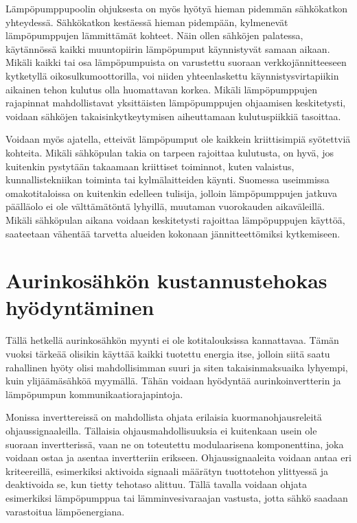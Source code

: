   Lämpöpumppupoolin ohjuksesta on myös hyötyä hieman pidemmän sähkökatkon yhteydessä. Sähkökatkon kestäessä hieman pidempään, kylmenevät lämpöpumppujen lämmittämät kohteet. Näin ollen sähköjen palatessa, käytännössä kaikki muuntopiirin lämpöpumput käynnistyvät samaan aikaan. Mikäli kaikki tai osa lämpöpumpuista on varustettu suoraan verkkojännitteeseen kytketyllä oikosulkumoottorilla, voi niiden yhteenlaskettu käynnistysvirtapiikin aikainen tehon kulutus olla huomattavan korkea. Mikäli lämpöpumppujen rajapinnat mahdollistavat yksittäisten lämpöpumppujen ohjaamisen keskitetysti, voidaan sähköjen takaisinkytkeytymisen aiheuttamaan kulutuspiikkiä tasoittaa.

  Voidaan myös ajatella, etteivät lämpöpumput ole kaikkein kriittisimpiä syötettviä kohteita. Mikäli sähköpulan takia on tarpeen rajoittaa kulutusta, on hyvä, jos kuitenkin pystytään takaamaan kriittiset toiminnot, kuten valaistus, kunnallistekniikan toiminta tai kylmälaitteiden käynti. Suomessa useimmissa omakotitaloissa on kuitenkin edelleen tulisija, jolloin lämpöpumppujen jatkuva päälläolo ei ole välttämätöntä lyhyillä, muutaman vuorokauden aikaväleillä. Mikäli sähköpulan aikana voidaan keskitetysti rajoittaa lämpöpuppujen käyttöä, saateetaan vähentää tarvetta alueiden kokonaan jännitteettömiksi kytkemiseen.

\section{Aurinkosähkön kustannustehokas hyödyntäminen}

  Tällä hetkellä aurinkosähkön myynti ei ole kotitalouksissa kannattavaa. Tämän vuoksi tärkeää olisikin käyttää kaikki tuotettu energia itse, jolloin siitä saatu rahallinen hyöty olisi mahdollisimman suuri ja siten takaisinmaksuaika lyhyempi, kuin ylijäämäsähköä myymällä. Tähän voidaan hyödyntää aurinkoinvertterin ja lämpöpumpun kommunikaatiorajapintoja.

  Monissa inverttereissä on mahdollista ohjata erilaisia kuormanohjausreleitä ohjaussignaaleilla. Tällaisia ohjausmahdollisuuksia ei kuitenkaan usein ole suoraan invertterissä, vaan ne on toteutettu modulaarisena komponenttina, joka voidaan ostaa ja asentaa invertteriin erikseen. Ohjaussignaaleita voidaan antaa eri kriteereillä, esimerkiksi aktivoida signaali määrätyn tuottotehon ylittyessä ja deaktivoida se, kun tietty tehotaso alittuu. Tällä tavalla voidaan ohjata esimerkiksi lämpöpumppua tai lämminvesivaraajan vastusta, jotta sähkö saadaan varastoitua lämpöenergiana.


